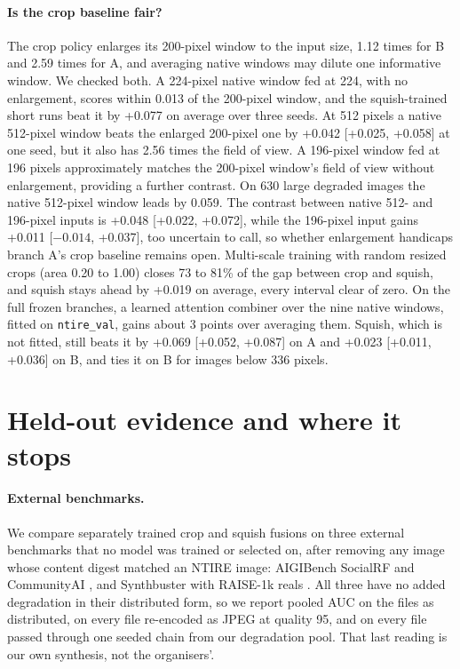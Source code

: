 \documentclass[letterpaper]{article} %
\begin{document}
\paragraph{Is the crop baseline fair?} The crop policy enlarges its
200-pixel window to the input size, 1.12 times for B and 2.59 times for A,
and averaging native windows may dilute one informative window. We checked
both. A 224-pixel native window fed at 224, with no enlargement, scores
within 0.013 of the 200-pixel window, and the squish-trained short runs beat it
by +0.077 on average over three seeds. At 512 pixels a native 512-pixel
window beats the enlarged 200-pixel one by +0.042 [+0.025, +0.058] at one
seed, but it also has 2.56 times the field of view. A 196-pixel window
fed at 196 pixels approximately matches the 200-pixel window's field of
view without enlargement, providing a further contrast. On 630 large degraded images
the native 512-pixel window leads by 0.059. The contrast between native 512- and 196-pixel inputs is +0.048
[+0.022, +0.072], while the 196-pixel input gains +0.011 [$-0.014$, +0.037], too
uncertain to call, so whether enlargement handicaps branch A's crop baseline
remains open.
Multi-scale training with random resized crops (area 0.20 to 1.00) closes 73
to 81\% of the gap between crop and squish, and squish stays ahead by +0.019
on average, every interval clear of zero. On the full frozen branches, a
learned attention combiner over the nine native windows, fitted on
\texttt{ntire\_val}, gains about 3 points over averaging them. Squish, which
is not fitted, still beats it by +0.069 [+0.052, +0.087] on A and +0.023
[+0.011, +0.036] on B, and ties it on B for images below 336 pixels.

\section{Held-out evidence and where it stops}
\label{sec:heldout}

\paragraph{External benchmarks.} We compare separately trained crop and
squish fusions on three external benchmarks that no model was trained or selected on, after removing any image whose content
digest matched an NTIRE image: AIGIBench SocialRF and CommunityAI
\cite{li2025aigibench}, and Synthbuster with RAISE-1k reals
\cite{bammey2024synthbuster,dangnguyen2015raise}. All three have no added degradation in their distributed form, so we
report pooled AUC on the files as distributed, on every file re-encoded as
JPEG at quality 95, and on every file passed through one seeded chain from
our degradation pool. That last reading is our own synthesis, not the
organisers'.
\end{document}
